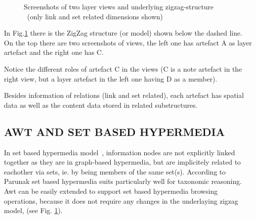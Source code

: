 \begin{figure}[h]
\centering
{}
\caption{Screenshots of two layer views and underlying zigzag-structure \
(only link and set related dimensions shown)}
\label{fig:view-zzstructure}
\end{figure}      

In Fig.\ref{fig:view-zzstructure} there is the ZigZag structure (or model)
shown below the dashed line. On the top there are two screenshots of views,
the left one has artefact A as layer artefact and the right one has C.

Notice the different roles of artefact C in the views (C is a note artefact 
in the right view, but a layer artefact in the left one having D as a member). 

Besides information of relations (link and set related), each artefact has 
spatial data as well as the content data stored in related substructures. 

\subsection{AWT AND SET BASED HYPERMEDIA}
In set based hypermedia model~\cite{parunak91set-based-hypermedia}, 
information nodes are not explicitly linked together as they are 
in graph-based hypermedia, but are implicitely related to eachother via 
sets, ie. by being members of the same set(s). According to Parunak 
\cite{parunak91set-based-hypermedia} set based hypermedia 
suits particularly well for taxonomic reasoning. Awt can be easily extended
to support set based hypermedia browsing operations, because it does
not require any changes in the underlaying zigzag model, 
(see Fig. \ref{fig:view-zzstructure}).
   
 







